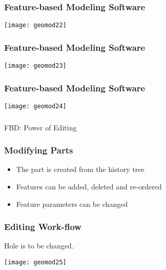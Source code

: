 \begin{frame}[fragile]\frametitle{Feature-based Modeling Software}

			\begin{center}
	\texttt{[image: geomod22]}
			\end{center}
\end{frame}

\begin{frame}[fragile]\frametitle{Feature-based Modeling Software}

			\begin{center}
	\texttt{[image: geomod23]}
			\end{center}
\end{frame}

\begin{frame}[fragile]\frametitle{Feature-based Modeling Software}

			\begin{center}
	\texttt{[image: geomod24]}
			\end{center}
\end{frame}

\begin{frame}[fragile]\frametitle{}
\begin{center}
{\Large FBD: Power of Editing }
\end{center}
\end{frame}

\begin{frame}[fragile]\frametitle{Modifying Parts}

\begin{itemize}
\item The part is created from the history tree
\item Features can be added, deleted and re-ordered
\item Feature parameters can be changed
\end{itemize}
\end{frame}


\begin{frame}[fragile]\frametitle{Editing Work-flow}

		Hole is to be changed.
		
			\begin{center}
	\texttt{[image: geomod25]}
			\end{center}
\end{frame}

